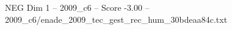 \begin{textsample}{NEG Dim 1 – 2009\_c6 – Score -3.00 – 2009\_c6/enade\_2009\_tec\_gest\_rec\_hum\_30bdeaa84c.txt}
\end{textsample}
